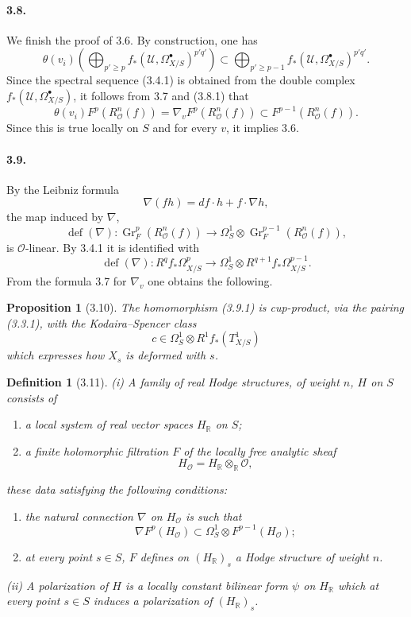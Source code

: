 \documentclass[10pt]{article}
\newcommand{\R}{\mathbb R}
\newcommand{\cO}{\mathcal O}
\newcommand{\cU}{\mathcal U}
\newcommand{\Gr}{\operatorname{Gr}}
\theoremstyle{deligne}
\newtheorem*{definition}{Definition}
\newtheorem*{proposition}{Proposition}
\begin{document}
\paragraph{3.8.}
We finish the proof of 3.6. By construction, one has
\begin{equation}
\theta(v_i)\left(\bigoplus_{p'\ge p} f_*(\cU,\Omega^\bullet_{X/S})^{p'q'}\right)
\subset
\bigoplus_{p'\ge p-1} f_*(\cU,\Omega^\bullet_{X/S})^{p'q'} .
\tag{3.8.1}
\end{equation}
Since the spectral sequence (3.4.1) is obtained from the double complex $f_*(\cU,\Omega^\bullet_{X/S})$, it follows from 3.7 and (3.8.1) that
\begin{equation}
\theta(v_i)F^p(R_\cO^n(f))=\nabla_vF^p(R_\cO^n(f))\subset F^{p-1}(R_\cO^n(f)).
\tag{3.8.2}
\end{equation}
Since this is true locally on $S$ and for every $v$, it implies 3.6.

\paragraph{3.9.}
By the Leibniz formula
\[
\nabla(fh)=df\cdot h+f\cdot \nabla h,
\]
the map induced by $\nabla$,
\[
\operatorname{def}(\nabla):\Gr_F^p(R_\cO^n(f))\longrightarrow
\Omega_S^1\otimes\Gr_F^{p-1}(R_\cO^n(f)),
\]
is $\cO$-linear. By 3.4.1 it is identified with
\begin{equation}
\operatorname{def}(\nabla):R^qf_*\Omega^p_{X/S}\longrightarrow
\Omega_S^1\otimes R^{q+1}f_*\Omega^{p-1}_{X/S}.
\tag{3.9.1}
\end{equation}
From the formula 3.7 for $\nabla_v$ one obtains the following.

\begin{proposition}[3.10]
The homomorphism (3.9.1) is cup-product, via the pairing (3.3.1), with the Kodaira--Spencer class
\[
c\in\Omega_S^1\otimes R^1f_*(T^1_{X/S})
\]
which expresses how $X_s$ is deformed with $s$.
\end{proposition}

\begin{definition}[3.11]
(i) A family of real Hodge structures, of weight $n$, $H$ on $S$ consists of
\begin{enumerate}[label=\alph*)]
\item a local system of real vector spaces $H_\R$ on $S$;
\item a finite holomorphic filtration $F$ of the locally free analytic sheaf
\[
H_\cO=H_\R\otimes_\R\cO,
\]
\end{enumerate}
these data satisfying the following conditions:
\begin{enumerate}[label=(H.\arabic*)]
\item the natural connection $\nabla$ on $H_\cO$ is such that
\[
\nabla F^p(H_\cO)\subset \Omega_S^1\otimes F^{p-1}(H_\cO);
\]
\item at every point $s\in S$, $F$ defines on $(H_\R)_s$ a Hodge structure of weight $n$.
\end{enumerate}
(ii) A polarization of $H$ is a locally constant bilinear form $\psi$ on $H_\R$ which at every point $s\in S$ induces a polarization of $(H_\R)_s$.
\end{definition}
\end{document}
